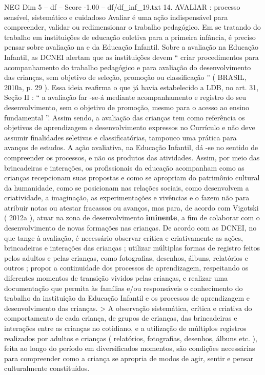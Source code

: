 \begin{textsample}{NEG Dim 5 – df – Score -1.00 – df/df\_inf\_19.txt}  \label{ex:f5_neg_138}
14.
AVALIAR : processo sensível, sistemático e cuidadoso Avaliar é uma ação indispensável para compreender, validar ou redimensionar o trabalho pedagógico.
Em se tratando do trabalho em instituições de educação coletiva para a primeira infância, é preciso pensar sobre avaliação na e da Educação Infantil.
Sobre a avaliação na Educação Infantil, as DCNEI alertam que as instituições devem “ criar procedimentos para acompanhamento do trabalho pedagógico e para avaliação do desenvolvimento das crianças, sem objetivo de seleção, promoção ou classificação ” ( BRASIL, 2010a, p. 29 ).
Essa ideia reafirma o que já havia estabelecido a LDB, no art. 31, Seção II : “ a avaliação far -se-á mediante acompanhamento e registro do seu desenvolvimento, sem o objetivo de promoção, mesmo para o acesso ao ensino fundamental ”.
Assim sendo, a avaliação das crianças tem como referência os objetivos de aprendizagem e desenvolvimento expressos no Currículo e não deve assumir finalidades seletivas e classificatórias, tampouco uma prática para avanços de estudos.
A ação avaliativa, na Educação Infantil, dá -se no sentido de compreender os processos, e não os produtos das atividades.
Assim, por meio das brincadeiras e interações, os profissionais da educação acompanham como as crianças recepcionam suas propostas e como se apropriam do patrimônio cultural da humanidade, como se posicionam nas relações sociais, como desenvolvem a criatividade, a imaginação, as experimentações e vivências e o fazem não para atribuir notas ou atestar fracassos ou avanços, mas para, de acordo com Vigotski ( 2012a ), atuar na zona de desenvolvimento \textbf{iminente}, a fim de colaborar com o desenvolvimento de novas formações nas crianças.
De acordo com as DCNEI, no que tange à avaliação, é necessário observar crítica e criativamente as ações, brincadeiras e interações das crianças ; utilizar múltiplas formas de registro feitos pelos adultos e pelas crianças, como fotografias, desenhos, álbuns, relatórios e outros ; propor a continuidade dos processos de aprendizagem, respeitando os diferentes momentos de transição vividos pelas crianças, e realizar uma documentação que permita às famílias e/ou responsáveis o conhecimento do trabalho da instituição da Educação Infantil e os processos de aprendizagem e desenvolvimento das crianças. > A observação sistemática, crítica e criativa do comportamento de cada criança, de grupos de crianças, das brincadeiras e interações entre as crianças no cotidiano, e a utilização de múltiplos registros realizados por adultos e crianças ( relatórios, fotografias, desenhos, álbuns etc. ), feita ao longo do período em diversificados momentos, são condições necessárias para compreender como a criança se apropria de modos de agir, sentir e pensar culturalmente constituídos.

\end{textsample}
